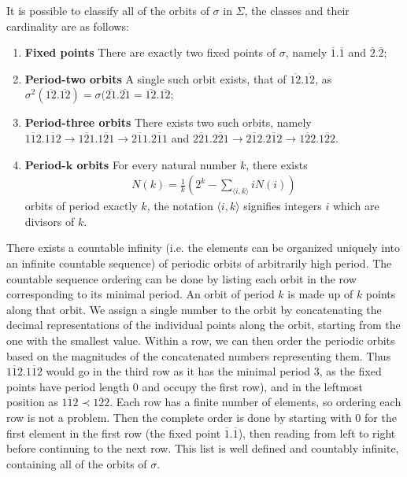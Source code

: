 It is possible to classify all of the orbits of $\sigma $ in $\Sigma$, the classes and their cardinality are as follows:
\begin{enumerate}
	\item \textbf{Fixed points} There are exactly two fixed points of $\sigma$, namely $\overline{1}\bm{.} \overline{1}$ and $\overline{2}\bm{.} \overline{2}$; 
	\item \textbf{Period-two orbits} A single such orbit exists, that of $\overline{12}\bm{.} \overline{12}$, as $\sigma^{2}(\overline{12}\bm{.} \overline{12}) = \sigma(\overline{21}\bm{.} \overline{21} = \overline{12}\bm{.} \overline{12}$;
	\item \textbf{Period-three orbits} There exists two such orbits, namely $\overline{112}\bm{.} \overline{112} \to \overline{121}\bm{.} \overline{121} \to \overline{211}\bm{.} \overline{211}$ and $\overline{221} \bm{.} \overline{221} \to \overline{212}\bm{.} \overline{212} \to \overline{122}\bm{.} \overline{122} $.
	\item \textbf{Period-$\bm{k} $ orbits} For every natural number $k$, there exists 
		\begin{align}
			\boxed{N(k) = \frac{1}{k}\left(2^k - \sum_{\langle i,k \rangle }^{} i N(i)\right)}		
		\end{align}
		orbits of period exactly $k$, the notation $\langle i,k\rangle$ signifies integers $i$ which are divisors of $k$.	
\end{enumerate}
There exists a countable infinity (i.e. the elements can be organized uniquely into an infinite countable sequence) of periodic orbits of arbitrarily high period. The countable sequence ordering can be done by listing each orbit in the row corresponding to its minimal period. An orbit of period $k$  is made up of $k$ points along that orbit. We assign a single number to the orbit by concatenating the decimal representations of the individual points along the orbit, starting from the one with the smallest value. Within a row, we can then order the periodic orbits based on the magnitudes of the concatenated numbers representing them. Thus $\overline{112}\bm{.} \overline{112}$ would go in the third row as it has the minimal period $3$, as the fixed points have period length $0$ and occupy the first row), and in the leftmost position as $\overline{112} \prec \overline{122}$. Each row has a finite number of elements, so ordering each row is not a problem. Then the complete order is done by starting with $0$ for the first element in the first row (the fixed point $\overline{1}\bm{.} \overline{1}$), then reading from left to right before continuing to the next row. This list is well defined and countably infinite, containing all of the orbits of $\sigma$.


